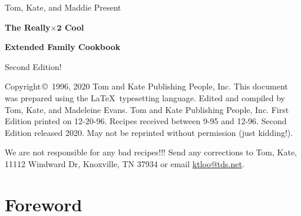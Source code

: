\documentclass[12pt]{book}
\begin{document}

\frontmatter

\begin{titlepage}
\vspace*{1.5in}
\begin{center}
\begin{LARGE}
Tom, Kate, and Maddie Present\\
\end{LARGE}
\begin{huge}
\vspace{2\baselineskip}
{\bf The Really$\mathbf{\times 2}$ Cool}\\
\end{huge}
\begin{Huge}
\vspace{2\baselineskip}
{\bf Extended Family Cookbook}\\
\end{Huge}
\begin{LARGE}
\vspace{3\baselineskip}
Second Edition!
\end{LARGE}
\end{center}
\end{titlepage}

\vspace*{\fill}
Copyright\,\copyright\, 1996, 2020 Tom and Kate Publishing People, Inc.
This document was prepared using the \LaTeX\ typesetting language.
Edited and compiled by Tom, Kate, and Madeleine Evans.  Tom and Kate Publishing
People, Inc.
First Edition printed on 12-20-96.  Recipes  received between 9-95 and
12-96.
Second Edition released 2020.
May not be reprinted without permission (just kidding!).

\vspace{1\baselineskip}
We are not responsible for any bad recipes!!!  Send any corrections to Tom, Kate, 11112 Windward Dr, Knoxville, TN 37934 or email \href{mailto:ktloo@tds.net}{ktloo@tds.net}.
\pagebreak

\pagestyle{headings}
\tableofcontents

\chapter{Foreword}
\end{document}
